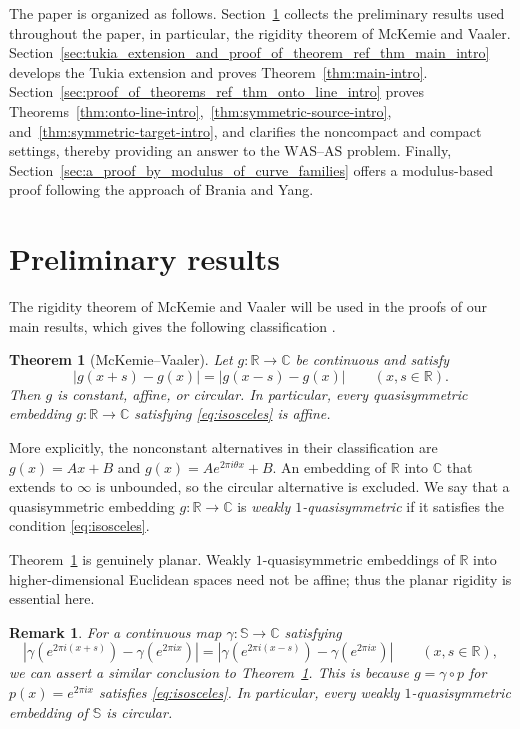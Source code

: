 \documentclass[10pt,a4paper]{amsart}
\numberwithin{equation}{section}
\newtheorem{theorem}{Theorem}[section]
\newtheorem*{remark}{Remark} %
\newcommand{\R}{\mathbb{R}}
\newcommand{\C}{\mathbb{C}}
\begin{document}
The paper is organized as follows. 
Section~\ref{sec:preliminary_results} collects the preliminary results used throughout the paper, in particular,
the rigidity theorem of McKemie and Vaaler.
Section~\ref{sec:tukia_extension_and_proof_of_theorem_ref_thm_main_intro} develops the Tukia extension and proves Theorem~\ref{thm:main-intro}. 
Section~\ref{sec:proof_of_theorems_ref_thm_onto_line_intro} proves Theorems~\ref{thm:onto-line-intro},~\ref{thm:symmetric-source-intro}, and~\ref{thm:symmetric-target-intro}, and clarifies the noncompact and compact settings, thereby providing an answer to the $\mathrm{WAS}$--$\mathrm{AS}$ problem.
Finally, Section~\ref{sec:a_proof_by_modulus_of_curve_families} offers a modulus-based proof following the approach of Brania and Yang.


\section{Preliminary results}\label{sec:preliminary_results}

The rigidity theorem of McKemie and Vaaler will be used in the proofs of our main results, which gives the following classification
\cite[Theorem~1 and Corollary~2]{McKemieVaaler}.

\begin{theorem}[McKemie--Vaaler]\label{thm:MV}
Let $g\colon\R\to\C$ be continuous and satisfy
\begin{equation}\label{eq:isosceles}
 |g(x+s)-g(x)|=|g(x-s)-g(x)|\qquad(x,s\in\R).
\end{equation}
Then $g$ is constant, affine, or circular.  
In particular, every quasisymmetric embedding $g\colon\R\to\C$ satisfying \eqref{eq:isosceles} is affine.
\end{theorem}

More explicitly, the nonconstant alternatives in their classification are $g(x)=Ax+B$ and $g(x)=Ae^{2\pi i\theta x}+B$.  
An embedding of $\R$ into $\C$ that extends to $\infty$ is unbounded, so the circular alternative is excluded.
We say that a quasisymmetric embedding $g\colon\R\to\C$ is {\it weakly $1$-quasisymmetric} if it satisfies the condition \eqref{eq:isosceles}.

Theorem~\ref{thm:MV} is genuinely planar.  
Weakly $1$-quasisymmetric embeddings of $\R$ into higher-dimensional Euclidean spaces need not be affine; thus the planar rigidity is essential here.

\begin{remark}
For a continuous map $\gamma\colon \mathbb S \to \mathbb C$ satisfying
\begin{equation}\label{eq:isosceles-circle}
|\gamma(e^{2\pi i(x+s)})-\gamma(e^{2\pi ix})|=|\gamma(e^{2\pi i(x-s)})-\gamma(e^{2\pi ix})|\qquad(x,s\in\R),
\end{equation}
we can assert a similar conclusion to Theorem~\ref{thm:MV}.
This is because $g=\gamma \circ p$ for $p(x)=e^{2\pi ix}$ satisfies \eqref{eq:isosceles}.
In particular, every weakly $1$-quasisymmetric embedding of $\mathbb S$ is circular.
\end{remark}
\end{document}
